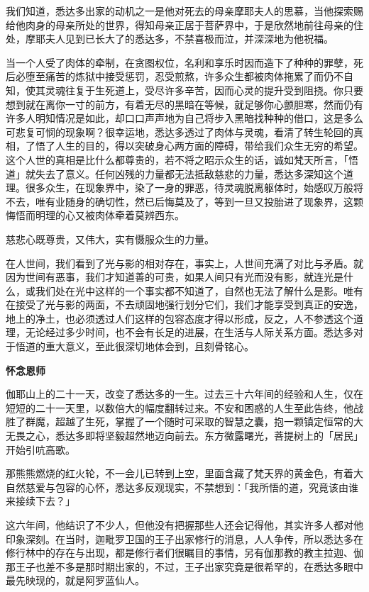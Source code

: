 \documentclass[twoside,openany]{book}
\newcommand{\mt}[1]{\textbullet \textbf{#1}}
\begin{document}
我们知道，悉达多出家的动机之一是他对死去的母亲摩耶夫人的思慕，当他探索赐给他肉身的母亲所处的世界，得知母亲正居于菩萨界中，于是欣然地前往母亲的住处，摩耶夫人见到已长大了的悉达多，不禁喜极而泣，并深深地为他祝福。

当一个人受了肉体的牵制，在贪图权位，名利和享乐时因而造下了种种的罪孽，死后必堕至痛苦的炼狱中接受惩罚，忍受煎熬，许多众生都被肉体拖累了而仍不自知，使其灵魂往复于生死道上，受尽许多辛苦，因而心灵的提升受到阻挠。你只要想到就在离你一寸的前方，有着无尽的黑暗在等候，就足够你心颤胆寒，然而仍有许多人明知情况是如此，却口口声声地为自己将步入黑暗找种种的借口，这是多么可悲复可悯的现象啊？很幸运地，悉达多透过了肉体与灵魂，看清了转生轮回的真相，了悟了人生的目的，得以突破身心两方面的障碍，带给我们众生无穷的希望。这个人世的真相是比什么都尊贵的，若不将之昭示众生的话，诚如梵天所言，「悟道」就失去了意义。任何凶残的力量都无法抵敌慈悲的力量，悉达多深知这个道理。很多众生，在现象界中，染了一身的罪恶，待灵魂脱离躯体时，始感叹万般将不去，唯有业随身的确切性，然已后悔莫及了，等到一旦又投胎进了现象界，这颗悔悟而明理的心又被肉体牵着莫辨西东。

慈悲心既尊贵，又伟大，实有慑服众生的力量。

在人世间，我们看到了光与影的相对存在，事实上，人世间充满了对比与矛盾。就因为世间有恶事，我们才知道善的可贵，如果人间只有光而没有影，就连光是什么，或我们处在光中这样的一个事实都不知道了，自然也无法了解什么是影。唯有在接受了光与影的两面，不去顽固地强行划分它们，我们才能享受到真正的安逸，地上的净土，也必须透过人们这样的包容态度才得以形成，反之，人不参透这个道理，无论经过多少时间，也不会有长足的进展，在生活与人际关系方面。悉达多对于悟道的重大意义，至此很深切地体会到，且刻骨铭心。

\mt{怀念恩师}

伽耶山上的二十一天，改变了悉达多的一生。过去三十六年间的经验和人生，仅在短短的二十一天里，以数倍大的幅度翻转过来。不安和困惑的人生至此告终，他战胜了群魔，超越了生死，掌握了一个随时可采取的智慧之囊，抱一颗镇定恒常的大无畏之心，悉达多即将坚毅超然地迈向前去。东方微露曙光，菩提树上的「居民」开始引吭高歌。

那熊熊燃烧的红火轮，不一会儿已转到上空，里面含藏了梵天界的黄金色，有着大自然慈爱与包容的心怀，悉达多反观现实，不禁想到：「我所悟的道，究竟该由谁来接续下去？」

这六年间，他结识了不少人，但他没有把握那些人还会记得他，其实许多人都对他印象深刻。在当时，迦毗罗卫国的王子出家修行的消息，人人争传，所以悉达多在修行林中的存在与出现，都是修行者们很瞩目的事情，另有伽那教的教主拉迦、伽那王子也差不多是那时期出家的，不过，王子出家究竟是很希罕的，在悉达多眼中最先映现的，就是阿罗蓝仙人。
\end{document}
